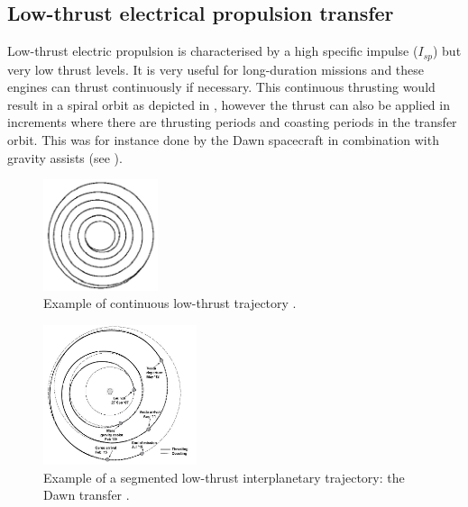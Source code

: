 \subsection{Low-thrust electrical propulsion transfer}
\label{subsec:low_elec_prop}
Low-thrust electric propulsion is characterised by a high specific impulse ($I_{sp}$) but very low thrust levels. It is very useful for long-duration missions and these engines can thrust continuously if necessary. This continuous thrusting would result in a spiral orbit as depicted in , however the thrust can also be applied in increments where there are thrusting periods and coasting periods in the transfer orbit. This was for instance done by the Dawn spacecraft in combination with gravity assists (see ).


\begin{figure}[!ht]
\centering
\includegraphics[width=0.3\textwidth]{figures/transfer_orbits/contelec_wertz2009.jpg}
\caption{Example of continuous low-thrust trajectory \cite{wertz2009}.}
\label{fig:contelec_wertz2009}
\end{figure}


\begin{figure}[!ht]
\centering
\includegraphics[width=0.4\textwidth]{figures/transfer_orbits/dawntrajectory_wakker2010.jpg}
\caption{Example of a segmented low-thrust interplanetary trajectory: the Dawn transfer \cite{wakker2010}.}
\label{fig:dawntrajectory_wakker2010}
\end{figure}

